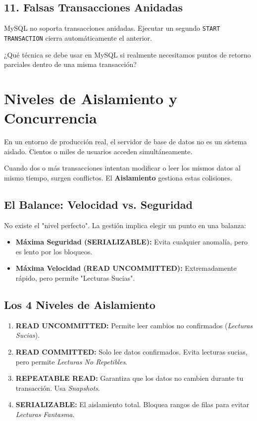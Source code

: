 \documentclass[12pt,a4paper]{article}
\begin{document}
\subsection{11. Falsas Transacciones Anidadas}
MySQL no soporta transacciones anidadas. Ejecutar un segundo \texttt{START TRANSACTION} cierra automáticamente el anterior.


\begin{tcolorbox}[title=Reflexión 11]
¿Qué técnica se debe usar en MySQL si realmente necesitamos puntos de retorno parciales dentro de una misma transacción?
\end{tcolorbox}

\section{Niveles de Aislamiento y Concurrencia}
En un entorno de producción real, el servidor de base de datos no es un sistema aislado. Cientos o miles de usuarios acceden simultáneamente.

\begin{tcolorbox}[title=El Reto de la Concurrencia]
Cuando dos o más transacciones intentan modificar o leer los mismos datos al mismo tiempo, surgen conflictos. El \textbf{Aislamiento} gestiona estas colisiones.
\end{tcolorbox}

\subsection{El Balance: Velocidad vs. Seguridad}
No existe el "nivel perfecto". La gestión implica elegir un punto en una balanza:
\begin{itemize}
    \item \textbf{Máxima Seguridad (SERIALIZABLE):} Evita cualquier anomalía, pero es lento por los bloqueos.
    \item \textbf{Máxima Velocidad (READ UNCOMMITTED):} Extremadamente rápido, pero permite "Lecturas Sucias".
\end{itemize}

\subsection{Los 4 Niveles de Aislamiento}
\begin{enumerate}
    \item \textbf{READ UNCOMMITTED:} Permite leer cambios no confirmados (\textit{Lecturas Sucias}).
    \item \textbf{READ COMMITTED:} Solo lee datos confirmados. Evita lecturas sucias, pero permite \textit{Lecturas No Repetibles}.
    \item \textbf{REPEATABLE READ:} Garantiza que los datos no cambien durante tu transacción. Usa \textit{Snapshots}.
    \item \textbf{SERIALIZABLE:} El aislamiento total. Bloquea rangos de filas para evitar \textit{Lecturas Fantasma}.
\end{enumerate}
\end{document}
